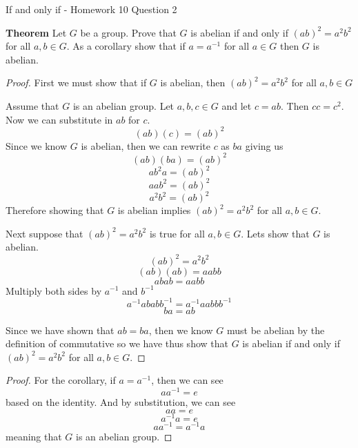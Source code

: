 If and only if - Homework 10 Question 2

\textbf{Theorem}
Let $G$ be a group.  Prove that $G$ is abelian if and only if $(ab)^2=a^2b^2$ for all $a,b\in G$. 
As a corollary show that if $a=a^{-1}$ for all $a\in G$ then $G$ is abelian.

\begin{proof} First we must show that if $G$ is abelian, then $(ab)^2=a^2b^2$ for all $a,b\in G$


Assume that $G$ is an abelian group. Let $a,b,c \in G$ and let $c = ab$. Then $cc = c^2$. Now we can substitute in $ab$ for $c$.
$$(ab)(c) = (ab)^2 $$ Since we know $G$ is abelian, then we can rewrite $c$ as $ba$ giving us $$(ab)(ba) = (ab)^2 $$ $$ab^2a = (ab)^2$$ $$ aab^2 = (ab)^2$$ $$a^2b^2 = (ab)^2$$ Therefore showing that $G$ is abelian implies $(ab)^2=a^2b^2$ for all $a,b\in G$.

Next suppose that $(ab)^2=a^2b^2$ is true for all $a,b\in G$. Lets show that $G$ is abelian.
$$ (ab)^2 = a^2b^2 $$
$$(ab)(ab) = aabb $$
$$abab = aabb $$ Multiply both sides by $a^{-1}$ and $b^{-1}$
$$a^{-1}abab b^{-1} = a^{-1}aabb b^{-1}$$
$$ ba = ab$$

Since we have shown that $ab = ba$, then we know $G$ must be abelian by the definition of commutative so we have thus show that $G$ is abelian if and only if $(ab)^2=a^2b^2$ for all $a,b\in G$.
\end{proof}
\begin{proof}
For the corollary, if $a=a^{-1}$, then we can see 
$$ aa^{-1}  = e$$ based on the identity. And by substitution, we can see
$$ aa = e $$
$$ a ^{-1} a = e $$
$$ aa^{-1} = a^{-1}a $$
meaning that $G$ is an abelian group.
\end{proof}